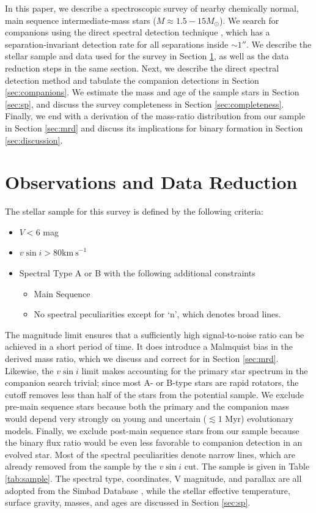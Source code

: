 \documentclass{emulateapj}
\begin{document}
In this paper, we describe a spectroscopic survey of nearby chemically normal, main sequence intermediate-mass stars ($M \approx 1.5 - 15 M_{\odot}$). We search for companions using the direct spectral detection technique \citep{Gullikson2016}, which has a separation-invariant detection rate for all separations inside $\sim 1 ''$. We describe the stellar sample and data used for the survey in Section \ref{sec:obs}, as well as the data reduction steps in the same section. Next, we describe the direct spectral detection method and tabulate the companion detections in Section \ref{sec:companions}. We estimate the mass and age of the sample stars in Section \ref{sec:sp}, and discuss the survey completeness in Section \ref{sec:completeness}. Finally, we end with a derivation of the mass-ratio distribution from our sample in Section \ref{sec:mrd} and discuss its implications for binary formation in Section \ref{sec:discussion}.
 


\section{Observations and Data Reduction}
\label{sec:obs}

The stellar sample for this survey is defined by the following criteria:

\begin{itemize}
\item $V < 6$ mag
\item $v\sin{i} > 80 \mathrm{km\ s}^{-1}$
\item Spectral Type A or B with the following additional constraints
\begin{itemize}
  \item Main Sequence
  \item No spectral peculiarities except for `n', which denotes broad lines.
\end{itemize}
\end{itemize}

The magnitude limit ensures that a sufficiently high signal-to-noise ratio can be achieved in a short period of time. It does introduce a Malmquist bias in the derived mass ratio, which we discuss and correct for in Section \ref{sec:mrd}. Likewise, the $v\sin{i}$ limit makes accounting for the primary star spectrum in the companion search trivial; since most A- or B-type stars are rapid rotators, the cutoff removes less than half of the stars from the potential sample. We exclude pre-main sequence stars because both the primary and the companion mass would depend very strongly on young and uncertain ($\lesssim 1$ Myr) evolutionary models. Finally, we exclude post-main sequence stars from our sample because the binary flux ratio would be even less favorable to companion detection in an evolved star. Most of the spectral peculiarities denote narrow lines, which are already removed from the sample by the $v\sin{i}$ cut. The sample is given in Table \ref{tab:sample}. The spectral type, coordinates, V magnitude, and parallax are all adopted from the Simbad Database \citep{Simbad}, while the stellar effective temperature, surface gravity, masses, and ages are discussed in Section \ref{sec:sp}. 
\end{document}
